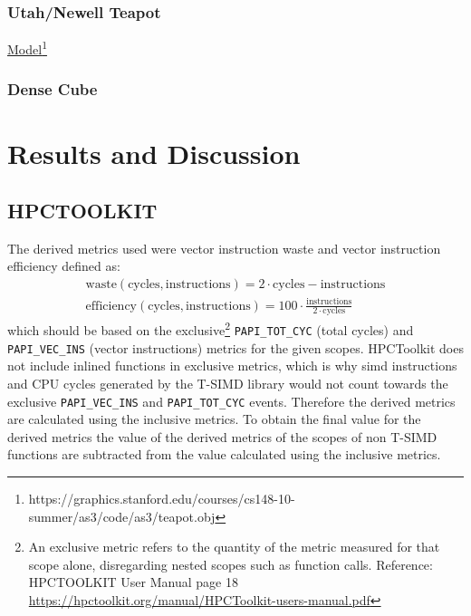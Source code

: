 \documentclass[a4paper, 11pt]{memoir}
\begin{document}
    \subsection{Utah/Newell Teapot}
    \href{https://graphics.stanford.edu/courses/cs148-10-summer/as3/code/as3/teapot.obj}{Model}\footnote{https://graphics.stanford.edu/courses/cs148-10-summer/as3/code/as3/teapot.obj}
    \subsection{Dense Cube}
    
    \chapter{Results and Discussion}
    \section{HPCTOOLKIT}
    \cite{hpc_toolkit}

    The derived metrics used were vector instruction waste and vector instruction efficiency defined as:
    \begin{align}
        \text{waste}(\text{cycles}, \text{instructions}) = 2 \cdot \text{cycles} - \text{instructions} \label{eq:vec_waste}\\
        \text{efficiency}(\text{cycles}, \text{instructions}) = 100 \cdot \frac{\text{instructions}}{2\cdot\text{cycles}} \label{eq:vec_efficiency}
    \end{align}
    which should be based on the exclusive\footnote{An exclusive metric refers to the quantity of the metric measured for that scope
    alone, disregarding nested scopes such as function calls. Reference: HPCTOOLKIT User Manual page 18
    \href{https://hpctoolkit.org/manual/HPCToolkit-users-manual.pdf}{https://hpctoolkit.org/manual/HPCToolkit-users-manual.pdf}}
    \texttt{PAPI_TOT_CYC} (total cycles) and \texttt{PAPI_VEC_INS}
    (vector instructions) metrics for the given scopes. HPCToolkit does not include inlined functions in exclusive metrics, which is why \gls{simd}
    instructions and CPU cycles generated by the T-SIMD library would not count towards the exclusive \texttt{PAPI_VEC_INS} and \texttt{PAPI_TOT_CYC}
    events. Therefore the derived metrics are calculated using the inclusive metrics. To obtain the final value for the derived metrics the
    value of the derived metrics of the scopes of non T-SIMD functions are subtracted from the value calculated using the inclusive metrics.
\end{document}
